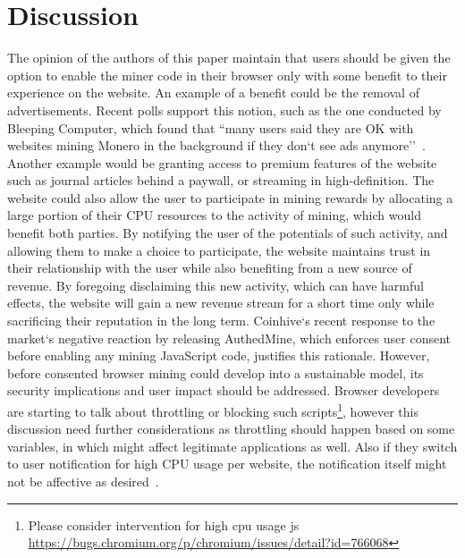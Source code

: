 \section{Discussion}
The opinion of the authors of this paper maintain that users should be given the option to enable the miner code in their browser only with some benefit to their experience on the website.  An example of a benefit could be the removal of advertisements. Recent polls support this notion, such as the one conducted by Bleeping Computer, which found that ``many users said they are OK with websites mining Monero in the background if they don`t see ads anymore''~\cite{bleepingcomputerminers}. Another example would be granting access to premium features of the website such as journal articles behind a paywall, or streaming in high-definition. The website could also allow the user to participate in mining rewards by allocating a large portion of their CPU resources to the activity of mining, which would benefit both parties. By notifying the user of the potentials of such activity, and allowing them to make a choice to participate, the website maintains trust in their relationship with the user while also benefiting from a new source of revenue. By foregoing disclaiming this new activity, which can have harmful effects, the website will gain a new revenue stream for a short time only while sacrificing their reputation in the long term. Coinhive`s recent response to the market`s negative reaction by releasing AuthedMine, which enforces user consent before enabling any mining JavaScript code, justifies this rationale. However, before consented browser mining could develop into a sustainable model, its security implications and user impact should be addressed.
Browser developers are starting to talk about throttling or blocking such scripts\footnote{Please consider intervention for high cpu usage js \url{https://bugs.chromium.org/p/chromium/issues/detail?id=766068}}, however this discussion need further considerations as throttling should happen based on some variables, in which might affect legitimate applications as well. Also if they switch to user notification for high CPU usage per website, the notification itself might not be affective as desired~\cite{SHB11}\cite{SEAAC09}.

